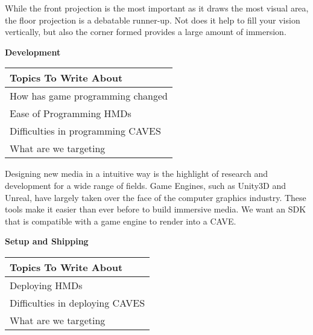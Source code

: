 	While the front projection is the most important as it draws the most visual area, the floor projection is a debatable runner-up. Not does it help to fill your vision vertically, but also the corner formed provides a large amount of immersion.
	
\filbreak
\noindent\textbf{Development}\\
    \begin{center}
        \begin{table}[H]
            \centering
            \renewcommand\arraystretch{0.5}
            \begin{tabular}{|l|}
                \hline 
                Topics To Write About \\ 
                \hline 
                How has game programming changed \\  
                Ease of Programming HMDs  \\
                Difficulties in programming CAVES  \\
                What are we targeting \\
                \hline 
            \end{tabular}
        \end{table}
    \end{center}
    
	Designing new media in a intuitive way is the highlight of research and development for a wide range of fields. Game Engines, such as Unity3D and Unreal, have largely taken over the face of the computer graphics industry. These tools make it easier than ever before to build immersive media. We want an SDK that is compatible with a game engine to render into a CAVE.

\filbreak
\noindent\textbf{Setup and Shipping}\\
    \begin{center}
        \begin{table}[H]
            \centering
            \renewcommand\arraystretch{0.5}
            \begin{tabular}{|l|}
                \hline 
                Topics To Write About \\ 
                \hline 
                Deploying HMDs \\  
                Difficulties in deploying CAVES  \\
                What are we targeting \\
                \hline 
            \end{tabular}
        \end{table}
    \end{center}
    

